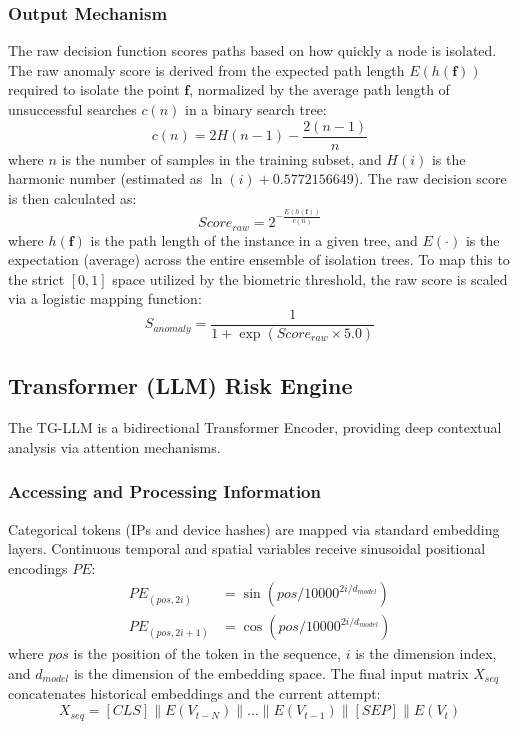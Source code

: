 \documentclass[pdflatex,sn-mathphys-num]{sn-jnl}
\theoremstyle{thmstyleone}%
\theoremstyle{thmstyletwo}%
\theoremstyle{thmstylethree}%
\begin{document}
\subsubsection{Output Mechanism}
The raw decision function scores paths based on how quickly a node is isolated. The raw anomaly score is derived from the expected path length $E(h(\mathbf{f}))$ required to isolate the point $\mathbf{f}$, normalized by the average path length of unsuccessful searches $c(n)$ in a binary search tree:
\begin{equation}
c(n) = 2H(n-1) - \frac{2(n-1)}{n} \tag{21}
\end{equation}
where $n$ is the number of samples in the training subset, and $H(i)$ is the harmonic number (estimated as $\ln(i) + 0.5772156649$). The raw decision score is then calculated as:
\begin{equation}
Score_{raw} = 2^{-\frac{E(h(\mathbf{f}))}{c(n)}} \tag{22}
\end{equation}
where $h(\mathbf{f})$ is the path length of the instance in a given tree, and $E(\cdot)$ is the expectation (average) across the entire ensemble of isolation trees. To map this to the strict $[0,1]$ space utilized by the biometric threshold, the raw score is scaled via a logistic mapping function:
\begin{equation}
S_{anomaly} = \frac{1}{1 + \exp(Score_{raw} \times 5.0)} \tag{23}
\end{equation}

\subsection{Transformer (LLM) Risk Engine}
The TG-LLM is a bidirectional Transformer Encoder, providing deep contextual analysis via attention mechanisms.

\subsubsection{Accessing and Processing Information}
Categorical tokens (IPs and device hashes) are mapped via standard embedding layers. Continuous temporal and spatial variables receive sinusoidal positional encodings $PE$:
\begin{align}
PE_{(pos, 2i)} &= \sin(pos / 10000^{2i/d_{model}}) \tag{24}\\
PE_{(pos, 2i+1)} &= \cos(pos / 10000^{2i/d_{model}}) \tag{25}
\end{align}
where $pos$ is the position of the token in the sequence, $i$ is the dimension index, and $d_{model}$ is the dimension of the embedding space. The final input matrix $X_{seq}$ concatenates historical embeddings and the current attempt:
\begin{equation}
X_{seq} = [CLS] \parallel E(V_{t-N}) \parallel \dots \parallel E(V_{t-1}) \parallel [SEP] \parallel E(V_t) \tag{26}
\end{equation}
\end{document}
